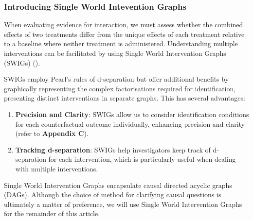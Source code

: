 \documentclass[
  single column]{article}
\providecommand{\tightlist}{%
  \setlength{\itemsep}{0pt}\setlength{\parskip}{0pt}}\usepackage{longtable,booktabs,array}
\begin{document}
\subsubsection{Introducing Single World Intevention
Graphs}\label{introducing-single-world-intevention-graphs}

When evaluating evidence for interaction, we must assess whether the
combined effects of two treatments differ from the unique effects of
each treatment relative to a baseline where neither treatment is
administered. Understanding multiple interventions can be facilitated by
using Single World Intervention Graphs (SWIGs)
().

SWIGs employ Pearl's rules of d-separation but offer additional benefits
by graphically representing the complex factorisations required for
identification, presenting distinct interventions in separate graphs.
This has several advantages:

\begin{enumerate}
\def\labelenumi{\arabic{enumi}.}
\tightlist
\item
  \textbf{Precision and Clarity}: SWIGs allow us to consider
  identification conditions for each counterfactual outcome
  individually, enhancing precision and clarity (refer to
  \textbf{Appendix C}).
\item
  \textbf{Tracking d-separation}: SWIGs help investigators keep track of
  d-separation for each intervention, which is particularly useful when
  dealing with multiple interventions.
\end{enumerate}

Single World Intervention Graphs encapsulate causal directed acyclic
graphs (DAGs). Although the choice of method for clarifying causal
questions is ultimately a matter of preference, we will use Single World
Intervention Graphs for the remainder of this article.
\end{document}
